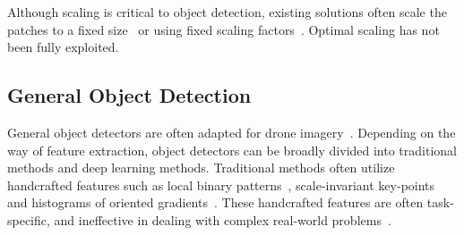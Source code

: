 \documentclass[letterpaper]{article} %
\newcommand\blue[1]{\textcolor{blue}{#1}}
\newcommand\rjf[1]{\textcolor{red}{\{RJF: #1\}}}
\begin{document}
Although scaling is critical to object detection, existing solutions often scale the patches to a fixed size~\cite{Xu_2022_AdaZoom} or using fixed scaling factors~\cite{Huang_2022_UFPMP}. Optimal scaling has not been fully exploited. 

\subsection{General Object Detection}
General object detectors are often adapted for drone imagery~\cite{Cai_2018_Cascade}. %
Depending on the way of feature extraction, object detectors can be broadly divided into traditional methods and deep learning methods. Traditional methods often utilize handcrafted features such as local binary patterns~\cite{Ren_2015_LBPVisualRecognition}, scale-invariant key-points~\cite{Lowe_2004_SIFT} and histograms of oriented gradients~\cite{Dalal_2005_HOG}. %
These handcrafted features are often task-specific, and ineffective in dealing with complex real-world problems~\cite{Bouguettaya_2022_review}.
\end{document}
